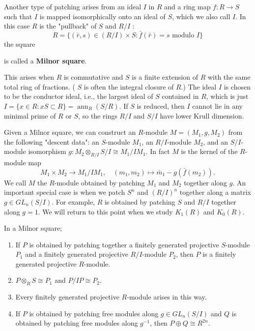 Another type of patching arises from an ideal $I$ in $R$ and a ring map $f: R \rightarrow S$ such that $I$ is mapped isomorphically onto an ideal of $S$, which we also call $I$. In this case $R$ is the "pullback" of $S$ and $R / I$ :
$$
R=\{(\bar{r}, s) \in(R / I) \times S: \bar{f}(\bar{r})=s \text { modulo } I\}
$$
the square  is called a {\bfseries Milnor square}.
\begin{example}
 This arises when $R$ is commutative and $S$ is a finite extension of $R$ with the same total ring of fractions. ( $S$ is often the integral closure of $R$.) The ideal $I$ is chosen to be the conductor ideal, i.e., the largest ideal of $S$ contained in $R$, which is just $I=\{x \in R: x S \subset R\}=\operatorname{ann}_R(S / R)$. If $S$ is reduced, then $I$ cannot lie in any minimal prime of $R$ or $S$, so the rings $R / I$ and $S / I$ have lower Krull dimension.
\end{example}

Given a Milnor square, we can construct an $R$-module $M=\left(M_1, g, M_2\right)$ from the following "descent data": an $S$-module $M_1$, an $R / I$-module $M_2$, and an $S / I$-module isomorphism $g: M_2 \otimes_{R / I} S / I \cong M_1 / I M_1$. In fact $M$ is the kernel of the $R$-module map
$$
M_1 \times M_2 \rightarrow M_1 / I M_1, \quad\left(m_1, m_2\right) \mapsto \bar{m}_1-g\left(\bar{f}\left(m_2\right)\right) .
$$
We call $M$ the $R$-module obtained by patching $M_1$ and $M_2$ together along $g$.
An important special case is when we patch $S^n$ and $(R / I)^n$ together along a matrix $g \in G L_n(S / I)$. For example, $R$ is obtained by patching $S$ and $R / I$ together along $g=1$. We will return to this point when we study $K_1(R)$ and $K_0(R)$.
\begin{theo}
    In a Milnor square;
    \begin{enumerate}
        \item If $P$ is obtained by patching together a finitely generated projective $S$-module $P_1$ and a finitely generated projective $R / I$-module $P_2$, then $P$ is a finitely generated projective $R$-module.
        \item $P \otimes_R S \cong P_1$ and $P / I P \cong P_2$.
        \item Every finitely generated projective $R$-module arises in this way.
        \item If $P$ is obtained by patching free modules along $g \in G L_n(S / I)$ and $Q$ is obtained by patching free modules along $g^{-1}$, then $P \oplus Q \cong R^{2 n}$.
    \end{enumerate} 
\end{theo}

